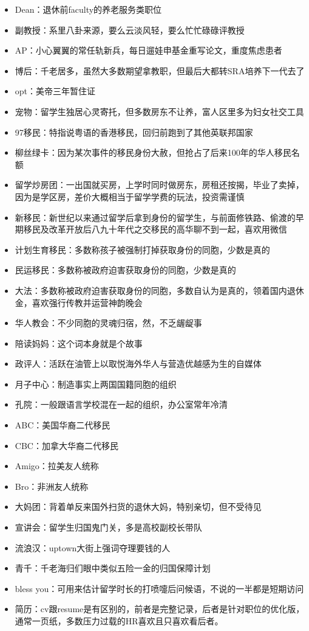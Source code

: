 \documentclass[]{tufte-book}
\begin{document}
\begin{itemize}
\item
  Dean：退休前faculty的养老服务类职位
\item
  副教授：系里八卦来源，要么云淡风轻，要么忙忙碌碌评教授
\item
  AP：小心翼翼的常任轨新兵，每日遛娃申基金重写论文，重度焦虑患者
\item
  博后：千老居多，虽然大多数期望拿教职，但最后大都转SRA培养下一代去了
\item
  opt：美帝三年暂住证
\item
  宠物：留学生独居心灵寄托，但多数房东不让养，富人区里多为妇女社交工具
\item
  97移民：特指说粤语的香港移民，回归前跑到了其他英联邦国家
\item
  柳丝绿卡：因为某次事件的移民身份大赦，但抢占了后来100年的华人移民名额
\item
  留学炒房团：一出国就买房，上学时同时做房东，房租还按揭，毕业了卖掉，因为是学区房，差价大概相当于留学学费的玩法，投资需谨慎
\item
  新移民：新世纪以来通过留学后拿到身份的留学生，与前面修铁路、偷渡的早期移民及改革开放后八九十年代之交移民的高华聊不到一起，喜欢用微信
\item
  计划生育移民：多数称孩子被强制打掉获取身份的同胞，少数是真的
\item
  民运移民：多数称被政府迫害获取身份的同胞，少数是真的
\item
  大法：多数称被政府迫害获取身份的同胞，多数自认为是真的，领着国内退休金，喜欢强行传教并运营神韵晚会
\item
  华人教会：不少同胞的灵魂归宿，然，不乏龌龊事
\item
  陪读妈妈：这个词本身就是个故事
\item
  政评人：活跃在油管上以取悦海外华人与营造优越感为生的自媒体
\item
  月子中心：制造事实上两国国籍同胞的组织
\item
  孔院：一般跟语言学校混在一起的组织，办公室常年冷清
\item
  ABC：美国华裔二代移民
\item
  CBC：加拿大华裔二代移民
\item
  Amigo：拉美友人统称
\item
  Bro：非洲友人统称
\item
  大妈团：背着单反来国外扫货的退休大妈，特别亲切，但不受待见
\item
  宣讲会：留学生归国鬼门关，多是高校副校长带队
\item
  流浪汉：uptown大街上强词夺理要钱的人
\item
  青千：千老海归们眼中类似五险一金的归国保障计划
\item
  bless you：可用来估计留学时长的打喷嚏后问候语，不说的一半都是短期访问
\item
  简历：cv跟resume是有区别的，前者是完整记录，后者是针对职位的优化版，通常一页纸，多数压力过载的HR喜欢且只喜欢看后者。
\end{itemize}
\end{document}
